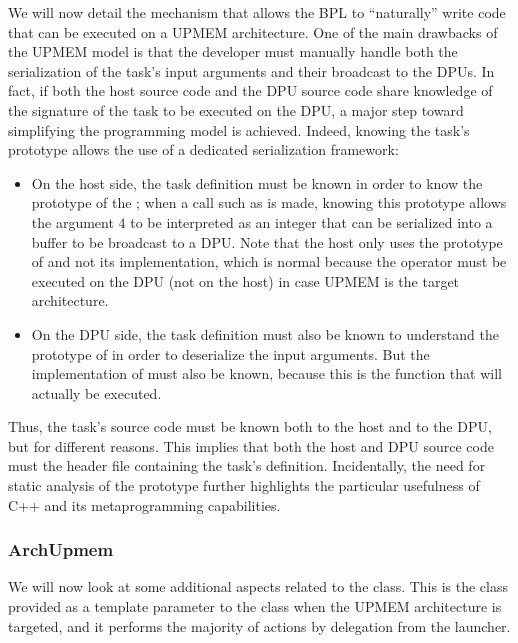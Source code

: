 We will now detail the mechanism that allows the BPL to “naturally” write code that can be executed on a UPMEM architecture. One of the main drawbacks of the UPMEM model is that the developer must manually handle both the serialization of the task’s input arguments and their broadcast to the DPUs. In fact, if both the host source code and the DPU source code share knowledge of the signature of the task to be executed on the DPU, a major step toward simplifying the programming model is achieved. Indeed, knowing the task’s prototype allows the use of a dedicated serialization framework:

\begin{itemize}

\item On the host side, the task definition must be known in order to know the prototype of the ; when a call such as  is made, knowing this prototype allows the argument $4$ to be interpreted  as an integer that can be serialized into a buffer to be broadcast to a DPU. Note that the host only uses the prototype of  and not its implementation, which is normal because the operator must be executed on the DPU (not on the host) in case UPMEM is the target architecture.

\item On the DPU side, the task definition must also be known to understand the prototype of  in order to deserialize the input arguments. But the implementation of  must also be known, because this is the function that will actually be executed.
\end{itemize}

Thus, the task’s source code must be known both to the host and to the DPU, but for different reasons. This implies that both the host and DPU source code must  the header file containing the task’s definition. Incidentally, the need for static analysis of the  prototype further highlights the particular usefulness of C++ and its metaprogramming capabilities.

 \subsubsection{ArchUpmem}
We will now look at some additional aspects related to the  class. This is the class provided as a template parameter to the  class when the UPMEM architecture is targeted, and it performs the majority of actions by delegation from the launcher.

